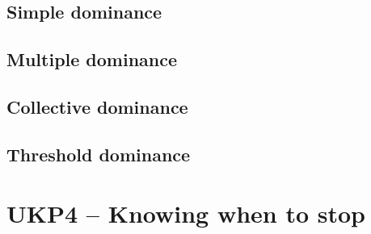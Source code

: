 \documentclass[12pt]{article}
\begin{document}
\subsection{Simple dominance}






\subsection{Multiple dominance}
\subsection{Collective dominance}
\subsection{Threshold dominance}





\section{UKP4 -- Knowing when to stop}
\end{document}
